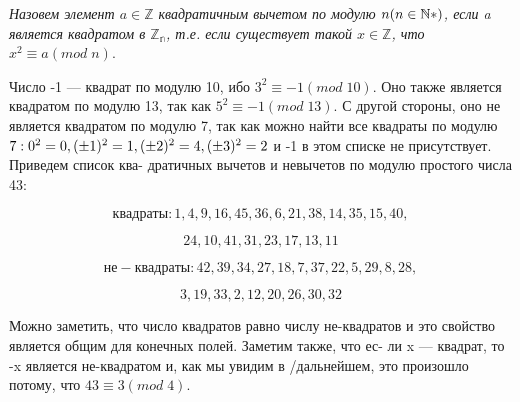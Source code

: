 \begin{determ}
\slshape{Назовем элемент $a \in \mathbb{Z}$ квадратичным вычетом по модулю $n \linebreak (n \in \mathbb{N*})$, если a является квадратом в $\mathbb{Z_{n}}$, т.е. если существует такой \linebreak $x \in \mathbb{Z}$, что $x^{2} \equiv a (mod \; n).$} \par 
\end{determ}
\noindent  {} \par 
  Число -1 --- квадрат по модулю 10, ибо $3^{2} \equiv -1 (mod \; 10)$. Оно \linebreak также является квадратом по модулю 13, так как $5^{2} \equiv -1 (mod \; 13)$. \linebreak С другой стороны, оно не является квадратом по модулю 7, так как \linebreak можно найти все квадраты по модулю $7: {0^{2}} = 0, (\pm 1)^{2} = 1, (\pm 2)^{2} = 4, \linebreak (\pm 3)^{2} = 2$ и -1 в этом списке не присутствует. Приведем список ква- \linebreak дратичных вычетов и невычетов по модулю простого числа 43: \par 
  
  $$квадраты: 1,4,9,16,45,36,6,21,38,14,35,15,40,$$ \par 
  $$ 24,10,41,31,23,17,13,11$$ \par 
  $$не-квадраты: 42,39,34,27,18,7,37,22,5,29,8,28,$$ \par 
  $$3,19,33,2,12,20,26,30,32$$ \par \newpage 
  
  
\noindent Можно заметить, что число квадратов равно числу не-квадратов и это \linebreak свойство является общим для конечных полей. Заметим также, что ес- \linebreak ли x --- квадрат, то -x является не-квадратом и, как мы увидим в /\linebreak дальнейшем, это произошло потому, что $43 \equiv 3 (mod \; 4).$ \linebreak
 
